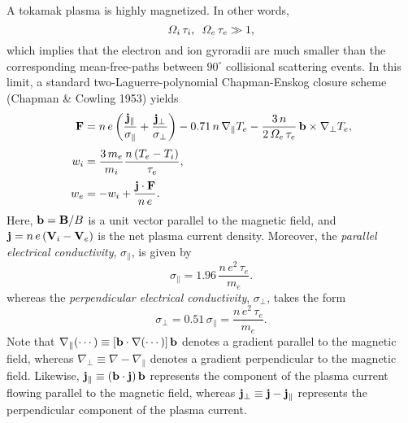 \documentclass[notitlepage,12pt]{article}
\begin{document}
A tokamak plasma is highly magnetized. In other words, 
\begin{equation}
{\mit\Omega}_i\,\tau_i, \,\,\,{\mit\Omega}_e\, \tau_e \gg 1,
\end{equation}
 which implies that the electron and ion gyroradii are much  smaller than the
corresponding mean-free-paths between $90^\circ$ collisional scattering events. In this limit, a standard two-Laguerre-polynomial
Chapman-Enskog closure scheme (Chapman \& Cowling 1953) yields
\begin{align}\label{e3.91a}
{\bf F}&= n\,e\left(\frac{{\bf j}_\parallel}{\sigma_\parallel}
+\frac{{\bf j}_\perp}{\sigma_\perp}\right) -0.71\,n\,\nabla_\parallel T_e
-\frac{3\,n}{2\,{\mit\Omega}_e\,\tau_e}\,{\bf b}\times\nabla_\perp T_e,
\\[0.5ex]
w_i &= \frac{3\,m_e}{m_i} \frac{n\,(T_e-T_i)}{\tau_e},\\[0.5ex]
w_e &= -w_i + \frac{ {\bf j}\cdot {\bf F} }{n \,e}.
\end{align}
Here, ${\bf b}={\bf B}/B$ is a unit vector parallel to the magnetic field, and ${\bf j}= n\,e\,({\bf V}_i-{\bf V}_e)$ is the net plasma current density. 
Moreover, the {\em parallel electrical conductivity}, $\sigma_\parallel$,  is given by
\begin{equation}\label{e3.83}
\sigma_\parallel = 1.96\,\frac{n \,e^2\,\tau_e}{m_e}.
\end{equation} 
whereas the {\em perpendicular electrical conductivity}, $\sigma_\perp$,  takes the form
\begin{equation}\label{e3.92}
\sigma_\perp = 0.51\,\sigma_\parallel = \frac{n\,e^2\,\tau_e}{m_e}.
\end{equation}
Note that $\nabla_\parallel(\cdots) \equiv [{\bf b}\cdot\nabla
(\cdots)]\,{\bf b}$ denotes a
gradient parallel to the magnetic field, whereas $\nabla_\perp \equiv
 \nabla-\nabla_\parallel$ denotes a gradient perpendicular to the magnetic
field. Likewise, ${\bf j}_\parallel \equiv ({\bf b}\cdot{\bf j})\,{\bf b}$
represents the component of the plasma current flowing parallel to the
magnetic field, whereas ${\bf j}_\perp \equiv {\bf j} - {\bf j}_\parallel$
represents the perpendicular component of the plasma current.
\end{document}
